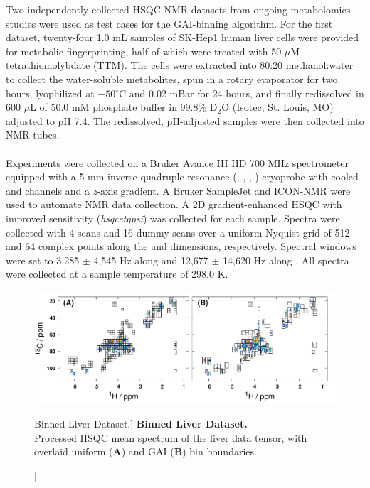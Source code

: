 \begin{doublespace}
Two independently collected \hcnmr{} HSQC NMR datasets from ongoing
metabolomics studies were used as test cases for the GAI-binning algorithm.
For the first dataset, twenty-four 1.0 mL samples of SK-Hep1 human liver cells
were provided for metabolic fingerprinting, half of which were treated with
50 $\mu$M tetrathiomolybdate (TTM). The cells were extracted into 80:20
methanol:water to collect the water-soluble metabolites, spun in a rotary
evaporator for two hours, lyophilized at $-50^\circ$C and 0.02 mBar for 24
hours, and finally redissolved in 600 $\mu$L of 50.0 mM phosphate buffer in
99.8\% D$_2$O (Isotec, St. Louis, MO) adjusted to pH 7.4. The redissolved,
pH-adjusted samples were then collected into NMR tubes.
\\\\
Experiments were collected on a Bruker Avance III HD 700 MHz spectrometer
equipped with a 5 mm inverse quadruple-resonance (\hnmr{}, \cnmr{}, \nnmr{},
\pnmr{}) cryoprobe with cooled \hnmr{} and \cnmr{} channels and a {\it z}-axis
gradient. A Bruker SampleJet and ICON-NMR were used to automate NMR data
collection. A 2D gradient-enhanced \hcnmr{} HSQC with improved sensitivity
\cite{palmer:jmr1991,kay:jacs1992} ({\it hsqcetgpsi}) was collected for
each sample. Spectra were collected with 4 scans and 16 dummy scans over a
uniform Nyquist grid of 512 and 64 complex points along the \hnmr{} and \cnmr{}
dimensions, respectively. Spectral windows were set to 3,285 $\pm$ 4,545 Hz
along \hnmr{} and 12,677 $\pm$ 14,620 Hz along \cnmr{}. All spectra were
collected at a sample temperature of 298.0 K.
\end{doublespace}

\begin{figure}[hb!]
\includegraphics[width=6in]{figs/gaibin/02-hsqc-liver.png}
\caption
      [Binned Liver Dataset.]{
  {\bf Binned Liver Dataset.}
  \\
  Processed \hcnmr{} HSQC mean spectrum of the liver data tensor, with
  overlaid uniform ({\bf A}) and GAI ({\bf B}) bin boundaries.
}
\label{figure.8.2}
\end{figure}

